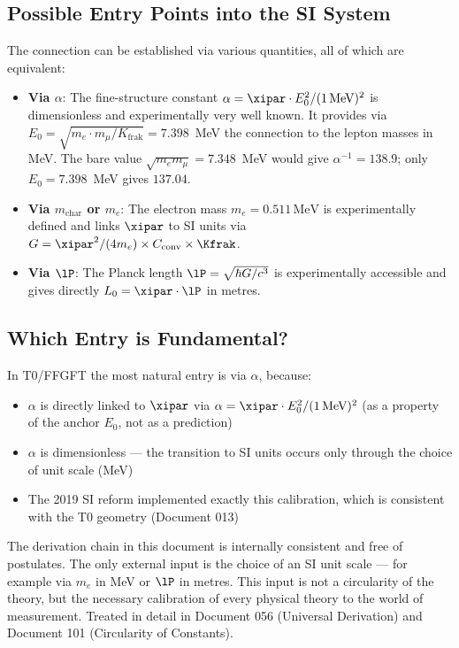 \subsection{Possible Entry Points into the SI System}

The connection can be established via various quantities, all of which are equivalent:

\begin{itemize}
	\item \textbf{Via $\alpha$}: The fine-structure constant $\alpha = \xipar \cdot E_0^2 / (1\,\text{MeV})^2$ is dimensionless and experimentally very well known. It provides via $E_0 = \sqrt{m_e \cdot m_\mu / K_{\text{frak}}} = 7.398$~MeV the connection to the lepton masses in MeV. The bare value $\sqrt{m_e m_\mu} = 7.348$~MeV would give $\alpha^{-1} = 138.9$; only $E_0 = 7.398$~MeV gives $137.04$.
	\item \textbf{Via $m_{\text{char}}$ or $m_e$}: The electron mass $m_e = 0{.}511\,\text{MeV}$ is experimentally defined and links $\xipar$ to SI units via $G = \xipar^2/(4m_e) \times C_{\text{conv}} \times \Kfrak$.
	\item \textbf{Via $\lP$}: The Planck length $\lP = \sqrt{\hbar G/c^3}$ is experimentally accessible and gives directly $L_0 = \xipar \cdot \lP$ in metres.
\end{itemize}

\subsection{Which Entry is Fundamental?}

In T0/FFGFT the most natural entry is via $\alpha$, because:
\begin{itemize}
	\item $\alpha$ is directly linked to $\xipar$ via $\alpha = \xipar \cdot E_0^2 / (1\,\text{MeV})^2$ (as a property of the anchor $E_0$, not as a prediction)
	\item $\alpha$ is dimensionless — the transition to SI units occurs only through the choice of unit scale (MeV)
	\item The 2019 SI reform implemented exactly this calibration, which is consistent with the T0 geometry (Document 013)
\end{itemize}

\begin{keyresult}
The derivation chain in this document is internally consistent and free of postulates. The only external input is the choice of an SI unit scale — for example via $m_e$ in MeV or $\lP$ in metres. This input is not a circularity of the theory, but the necessary calibration of every physical theory to the world of measurement. Treated in detail in Document 056 (Universal Derivation) and Document 101 (Circularity of Constants).
\end{keyresult}

